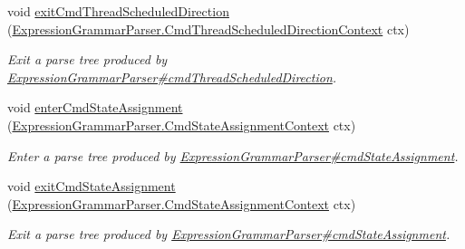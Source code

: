 \begin{DoxyCompactItemize}
void \hyperlink{interfacegov_1_1nasa_1_1jpf_1_1inspector_1_1server_1_1expression_1_1parser_1_1_expression_grammar_listener_a58e34eded1c4d75f730453008934ced3}{exit\+Cmd\+Thread\+Scheduled\+Direction} (\hyperlink{classgov_1_1nasa_1_1jpf_1_1inspector_1_1server_1_1expression_1_1parser_1_1_expression_grammar_pa3ae49d5d83c380526042a5aff91ee0a2}{Expression\+Grammar\+Parser.\+Cmd\+Thread\+Scheduled\+Direction\+Context} ctx)
\begin{DoxyCompactList}\small\item\em Exit a parse tree produced by \hyperlink{classgov_1_1nasa_1_1jpf_1_1inspector_1_1server_1_1expression_1_1parser_1_1_expression_grammar_parser_aa1e14518e300b02c71f006c270cb4c41}{Expression\+Grammar\+Parser\#cmd\+Thread\+Scheduled\+Direction}. \end{DoxyCompactList}\item 
void \hyperlink{interfacegov_1_1nasa_1_1jpf_1_1inspector_1_1server_1_1expression_1_1parser_1_1_expression_grammar_listener_a2788a1ed963a58d679a2180d310dc5ae}{enter\+Cmd\+State\+Assignment} (\hyperlink{classgov_1_1nasa_1_1jpf_1_1inspector_1_1server_1_1expression_1_1parser_1_1_expression_grammar_padaf6f2235297f2d833b81c76746458f3}{Expression\+Grammar\+Parser.\+Cmd\+State\+Assignment\+Context} ctx)
\begin{DoxyCompactList}\small\item\em Enter a parse tree produced by \hyperlink{classgov_1_1nasa_1_1jpf_1_1inspector_1_1server_1_1expression_1_1parser_1_1_expression_grammar_parser_a1958fde2beccd39e36dd73e36ef1ffd6}{Expression\+Grammar\+Parser\#cmd\+State\+Assignment}. \end{DoxyCompactList}\item 
void \hyperlink{interfacegov_1_1nasa_1_1jpf_1_1inspector_1_1server_1_1expression_1_1parser_1_1_expression_grammar_listener_a516ef38216044bcc4284ddf4b1e49e2c}{exit\+Cmd\+State\+Assignment} (\hyperlink{classgov_1_1nasa_1_1jpf_1_1inspector_1_1server_1_1expression_1_1parser_1_1_expression_grammar_padaf6f2235297f2d833b81c76746458f3}{Expression\+Grammar\+Parser.\+Cmd\+State\+Assignment\+Context} ctx)
\begin{DoxyCompactList}\small\item\em Exit a parse tree produced by \hyperlink{classgov_1_1nasa_1_1jpf_1_1inspector_1_1server_1_1expression_1_1parser_1_1_expression_grammar_parser_a1958fde2beccd39e36dd73e36ef1ffd6}{Expression\+Grammar\+Parser\#cmd\+State\+Assignment}. \end{DoxyCompactList}\item 

\end{DoxyCompactItemize}
